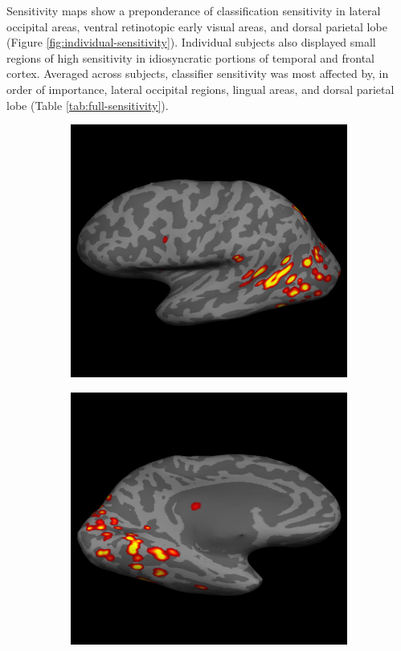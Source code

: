 \documentclass[preprint,5p,authoryear]{elsarticle}
\begin{document}
Sensitivity maps show a preponderance of classification sensitivity in
lateral occipital areas, ventral retinotopic early visual areas, and dorsal parietal lobe (Figure \ref{fig:individual-sensitivity}). 
Individual subjects also displayed small regions of high sensitivity in idiosyncratic portions of temporal and frontal cortex. 
Averaged across subjects, classifier sensitivity was most affected by, in order of importance, lateral occipital regions, lingual areas, and dorsal parietal lobe (Table \ref{tab:full-sensitivity}). 

\begin{figure}[p]
\centering
\begin{subfigure}{0.3\textwidth}
\centering
\includegraphics[width=\textwidth]{figures/s1-lh-lateral-sensitivity}
\caption{}
\label{fig:s1-lh-lateral-sensitivity}
\end{subfigure}
\begin{subfigure}{0.3\textwidth}
\centering
\includegraphics[width=\textwidth]{figures/s1-lh-medial-sensitivity}

\end{subfigure}
\end{figure}
\end{document}
